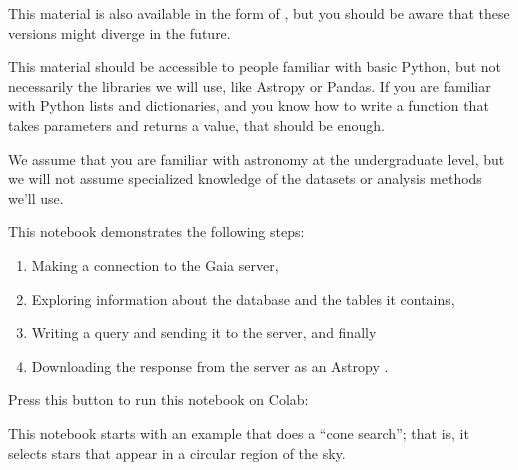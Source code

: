 \documentclass[letterpaper,10pt,english]{sphinxmanual}
\begin{document}
This material is also available in the form of , but you should be
aware that these versions might diverge in the future.


This material should be accessible to people familiar with basic Python, but not necessarily the libraries we will use, like Astropy or Pandas.  If you are familiar with Python lists and dictionaries, and you know how to write a function that takes parameters and returns a value, that should be enough.

We assume that you are familiar with astronomy at the undergraduate level, but we will not assume specialized knowledge of the datasets or analysis methods we’ll use.


This notebook demonstrates the following steps:
\begin{enumerate}
%
\item {} 
Making a connection to the Gaia server,

\item {} 
Exploring information about the database and the tables it contains,

\item {} 
Writing a query and sending it to the server, and finally

\item {} 
Downloading the response from the server as an Astropy .

\end{enumerate}

Press this button to run this notebook on Colab:




This notebook starts with an example that does a “cone search”; that is, it selects stars that appear in a circular region of the sky.
\end{document}
